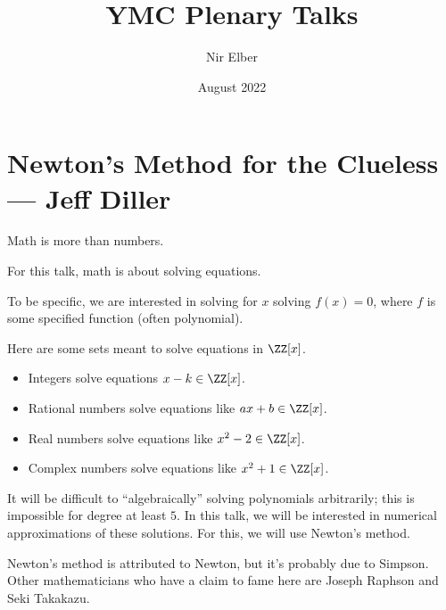 \documentclass{article}
\title{YMC Plenary Talks}
\author{Nir Elber}
\date{August 2022}
\begin{document}
\maketitle

\tableofcontents

\section{Newton's Method for the Clueless --- Jeff Diller}
Math is more than numbers.
\begin{idea}
	For this talk, math is about solving equations.
\end{idea}
To be specific, we are interested in solving for $x$ solving $f(x)=0$, where $f$ is some specified function (often polynomial).
\begin{example}
	Here are some sets meant to solve equations in $\ZZ[x]$.
	\begin{itemize}
		\item Integers solve equations $x-k\in\ZZ[x]$.
		\item Rational numbers solve equations like $ax+b\in\ZZ[x]$.
		\item Real numbers solve equations like $x^2-2\in\ZZ[x]$.
		\item Complex numbers solve equations like $x^2+1\in\ZZ[x]$.
	\end{itemize}
\end{example}
It will be difficult to ``algebraically'' solving polynomials arbitrarily; this is impossible for degree at least $5$. In this talk, we will be interested in numerical approximations of these solutions. For this, we will use Newton's method.
\begin{remark}
	Newton's method is attributed to Newton, but it's probably due to Simpson. Other mathematicians who have a claim to fame here are Joseph Raphson and Seki Takakazu.
\end{remark}
\end{document}
